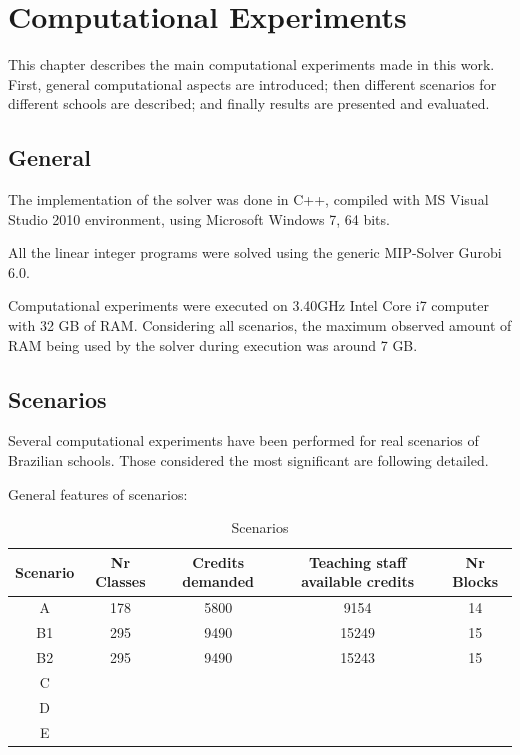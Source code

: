 \chapter{Computational Experiments}
\label{chap:experiments}


This chapter describes the main computational experiments made in this work. First, general computational aspects are introduced; then different scenarios for different schools are described; and finally results are presented and evaluated.


\section{General}

The implementation of the solver was done in C++, compiled with MS Visual Studio 2010 environment, using Microsoft Windows 7, 64 bits.

All the linear integer programs were solved using the generic MIP-Solver Gurobi 6.0. 

Computational experiments were executed on 3.40GHz Intel Core i7 computer with 32 GB of RAM. Considering all scenarios, the maximum observed amount of RAM being used by the solver during execution was around 7 GB.


\section{Scenarios}

Several computational experiments have been performed for real scenarios of Brazilian schools. Those considered the most significant are following detailed.

General features of scenarios:
\begin{table}[ht]
\caption{Scenarios} 							%
\centering
\begin{tabular}{c c c c c} 							%
\hline\hline 											%
Scenario & Nr Classes & Credits demanded & Teaching staff available credits & Nr Blocks \\ [0.5ex] 						%
\hline 														%
A & 178 & 5800 & 9154 & 14 \\
B1 & 295 & 9490 & 15249 & 15 \\
B2 & 295 & 9490 & 15243 & 15 \\
C & & & & \\
D & & & & \\
E & & & & \\ [1ex] 							%
\hline
\end{tabular}
\label{table:scenarios} 					%
\end{table}



